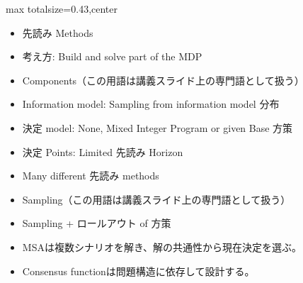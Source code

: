\clearpage
{}
\begin{minipage}[t]{0.405\textwidth}
\begin{adjustbox}{max totalsize={\textwidth}{0.43\textheight},center}
\begin{minipage}{\textwidth}\scriptsize
{}\begin{itemize}
\item 先読み Methods
\item 考え方: Build and solve part of the MDP
\item Components（この用語は講義スライド上の専門語として扱う）
\item Information model: Sampling from information model 分布
\item 決定 model: None, Mixed Integer Program or given Base 方策
\item 決定 Points: Limited 先読み Horizon
\item Many different 先読み methods
\item Sampling（この用語は講義スライド上の専門語として扱う）
\item Sampling + ロールアウト of 方策
\end{itemize}\begin{itemize}
\item MSAは複数シナリオを解き、解の共通性から現在決定を選ぶ。
\item Consensus functionは問題構造に依存して設計する。
\end{itemize}
\end{minipage}
\end{adjustbox}
\end{minipage}\hfill
